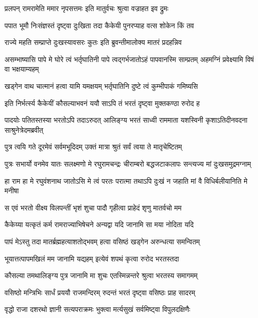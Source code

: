 \twolineshloka
{प्रलपन् रामरामेति ममार नृपसत्तमः}
{इति मातुर्वचः श्रुत्वा वज्राहत इव द्रुमः} %

\twolineshloka
{पपात भूमौ निःसंज्ञस्तं दृष्ट्वा दुःखिता तदा}
{कैकेयी पुनरप्याह वत्स शोकेन किं तव} %

\twolineshloka
{राज्ये महति सम्प्राप्ते दुःखस्यावसरः कुतः}
{इति ब्रुवन्तीमालोक्य मातरं प्रदहन्निव} %

\threelineshloka
{असम्भाष्यासि पापे मे घोरे त्वं भर्तृघातिनी}
{पापे त्वद्गर्भजातोऽहं पापवानस्मि साम्प्रतम्}
{अहमग्निं प्रवेक्ष्यामि विषं वा भक्षयाम्यहम्} %

\twolineshloka
{खड्गेन वाथ चात्मानं हत्वा यामि यमक्षयम्}
{भर्तृघातिनि दुष्टे त्वं कुम्भीपाकं गमिष्यसि} %

\twolineshloka
{इति निर्भर्त्स्य कैकेयीं कौसल्याभवनं ययौ}
{साऽपि तं भरतं दृष्ट्वा मुक्तकण्ठा रुरोद ह} %

\threelineshloka
{पादयोः पतितस्तस्या भरतोऽपि तदाऽरुदत्}
{आलिङ्ग्य भरतं साध्वी राममाता यशस्विनी}
{कृशाऽतिदीनवदना साश्रुनेत्रेदमब्रवीत्} %

\twolineshloka
{पुत्र त्वयि गते दूरमेवं सर्वमभूदिदम्}
{उक्तं मात्रा श्रुतं सर्वं त्वया ते मातृचेष्टितम्} %

\fourlineindentedshloka
{पुत्रः सभार्यो वनमेव यातः}
{सलक्ष्मणो मे रघुरामचन्द्रः}
{चीराम्बरो बद्धजटाकलापः}
{सन्त्यज्य मां दुःखसमुद्रमग्नाम्} %

\fourlineindentedshloka
{हा राम हा मे रघुवंशनाथ}
{जातोऽसि मे त्वं परतः परात्मा}
{तथाऽपि दुःखं न जहाति मां वै}
{विधिर्बलीयानिति मे मनीषा} %

\twolineshloka
{स एवं भरतो वीक्ष्य विलपन्तीं भृशं शुचा}
{पादौ गृहीत्वा प्राहेदं शृणु मातर्वचो मम} %

\twolineshloka
{कैकेय्या यत्कृतं कर्म रामराज्याभिषेचने}
{अन्यद्वा यदि जानामि सा मया नोदिता यदि} %

\twolineshloka
{पापं मेऽस्तु तदा मातर्ब्रह्महत्याशतोद्भवम्}
{हत्वा वसिष्ठं खड्गेन अरुन्धत्या समन्वितम्} %

\twolineshloka
{भूयात्तत्पापमखिलं मम जानामि यद्यहम्}
{इत्येवं शपथं कृत्वा रुरोद भरतस्तदा} %

\twolineshloka
{कौसल्या तमथालिङ्ग्य पुत्र जानामि मा शुचः}
{एतस्मिन्नन्तरे श्रुत्वा भरतस्य समागमम्} %

\twolineshloka
{वसिष्ठो मन्त्रिभिः सार्धं प्रययौ राजमन्दिरम्}
{रुदन्तं भरतं दृष्ट्वा वसिष्ठः प्राह सादरम्} %

\twolineshloka
{वृद्धो राजा दशरथो ज्ञानी सत्यपराक्रमः}
{भुक्त्वा मर्त्यसुखं सर्वमिष्ट्वा विपुलदक्षिणैः} %

